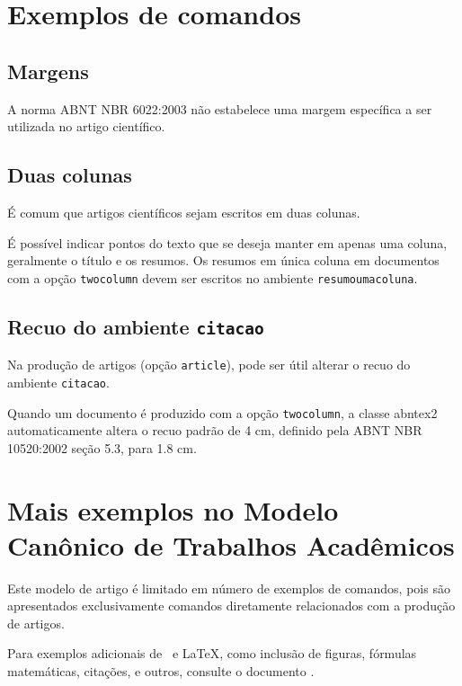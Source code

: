 \documentclass[
article,			%
11pt,				%
twoside,			%
a4paper,			%
twocolumn,          %
english,			%
brazil,				%
sumario=tradicional
]{abntex2}
\begin{document}
    \section{Exemplos de comandos}
    
    \subsection{Margens}
    
    A norma ABNT NBR 6022:2003 não estabelece uma margem específica a ser utilizada no artigo científico. 
    
    \subsection{Duas colunas}
    
    É comum que artigos científicos sejam escritos em duas colunas.
    
    É possível indicar pontos do texto que se deseja manter em apenas uma coluna, geralmente o título e os resumos. Os resumos em única coluna em documentos com a opção \texttt{twocolumn} devem ser escritos no ambiente \texttt{resumoumacoluna}.
    
    \subsection{Recuo do ambiente \texttt{citacao}}
    
    Na produção de artigos (opção \texttt{article}), pode ser útil alterar o recuo do ambiente \texttt{citacao}.
    
    Quando um documento é produzido com a opção \texttt{twocolumn}, a classe \textsf{abntex2} automaticamente altera o recuo padrão de 4 cm, definido pela ABNT NBR 10520:2002 seção 5.3, para 1.8 cm.
    
    \section{Mais exemplos no Modelo Canônico de Trabalhos Acadêmicos}
    
    Este modelo de artigo é limitado em número de exemplos de comandos, pois são apresentados exclusivamente comandos diretamente relacionados com a produção de artigos.
    
    Para exemplos adicionais de \abnTeX\ e \LaTeX, como inclusão de figuras, fórmulas matemáticas, citações, e outros, consulte o documento .
    
\end{document}
